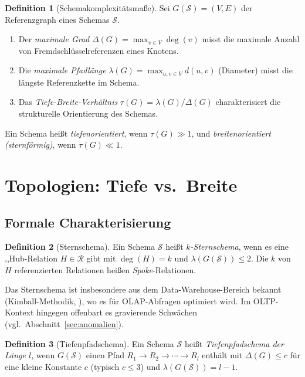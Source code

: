﻿\documentclass[12pt,a4paper]{article}
\theoremstyle{definition}
\newtheorem{definition}{Definition}[section]
\theoremstyle{remark}
\begin{document}
\begin{definition}[Schemakomplexitätsmaße]
\label{def:masse}
Sei $G(\mathcal{S}) = (V, E)$ der Referenzgraph eines Schemas $\mathcal{S}$.
\begin{enumerate}[label=(\roman*)]
  \item Der \emph{maximale Grad} $\Delta(G) = \max_{v \in V} \deg(v)$ misst
        die maximale Anzahl von Fremdschlüsselreferenzen eines Knotens.
  \item Die \emph{maximale Pfadlänge} $\lambda(G) = \max_{u,v \in V} d(u,v)$
        (Diameter) misst die längste Referenzkette im Schema.
  \item Das \emph{Tiefe-Breite-Verhältnis} $\tau(G) = \lambda(G) / \Delta(G)$
        charakterisiert die strukturelle Orientierung des Schemas.
\end{enumerate}
\end{definition}

Ein Schema heißt \emph{tiefenorientiert}, wenn $\tau(G) \gg 1$, und
\emph{breitenorientiert (sternförmig)}, wenn $\tau(G) \ll 1$.

\section{Topologien: Tiefe vs.\ Breite}
\label{sec:topologien}

\subsection{Formale Charakterisierung}

\begin{definition}[Sternschema]
\label{def:stern}
Ein Schema $\mathcal{S}$ heißt \emph{$k$-Sternschema}, wenn es eine
,,Hub\grqq{}-Relation $H \in \mathcal{R}$ gibt mit $\deg(H) = k$ und
$\lambda(G(\mathcal{S})) \leq 2$. Die $k$ von $H$ referenzierten Relationen
heißen \emph{Spoke}-Relationen.
\end{definition}

Das Sternschema ist insbesondere aus dem Data-Warehouse-Bereich bekannt
(Kimball-Methodik, \cite{Kimball1996}), wo es für OLAP-Abfragen optimiert
wird. Im OLTP-Kontext hingegen offenbart es gravierende Schwächen
(vgl.\ Abschnitt~\ref{sec:anomalien}).

\begin{definition}[Tiefenpfadschema]
\label{def:tiefenpfad}
Ein Schema $\mathcal{S}$ heißt \emph{Tiefenpfadschema der Länge $l$},
wenn $G(\mathcal{S})$ einen Pfad $R_1 \to R_2 \to \cdots \to R_l$
enthält mit $\Delta(G) \leq c$ für eine kleine Konstante $c$ (typisch $c \leq 3$)
und $\lambda(G(\mathcal{S})) = l - 1$.
\end{definition}
\end{document}
